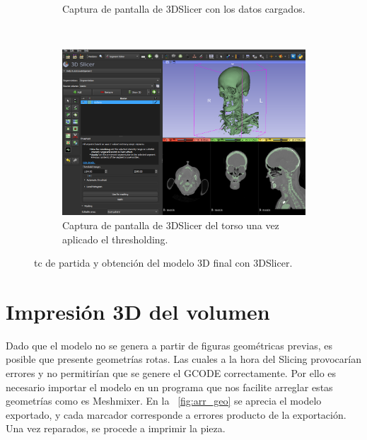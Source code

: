 \begin{figure}
\begin{minipage}[b]{.47\textwidth}
\begin{subfigure}{\textwidth}
      \caption{ Captura de pantalla de 3DSlicer con los datos cargados.}\label{fig:3dslier}
    \end{subfigure}\\
    \begin{subfigure}{\textwidth}
      \centering
      \includegraphics[width=\textwidth]{imaxes/segment_craneo.png}
      \caption{ Captura de pantalla de 3DSlicer del torso una vez aplicado el thresholding.}\label{fig:seg_cr}
    \end{subfigure}
  \end{minipage}
  \caption{\acrshort{tc} de partida y obtención del modelo 3D final con 3DSlicer.}
\end{figure}



\section{Impresión 3D del volumen}
 Dado que el modelo no se genera a partir de figuras geométricas previas, es posible que presente geometrías rotas. Las cuales a la hora del Slicing provocarían errores y no permitirían que se genere el GCODE correctamente.
 Por ello es necesario importar el modelo en un programa que nos facilite arreglar estas geometrías como es Meshmixer. En la \figurename~\ref{fig:arr_geo} se aprecia el modelo exportado, y cada marcador corresponde a errores producto de la exportación. Una vez reparados, se procede a imprimir la pieza.

